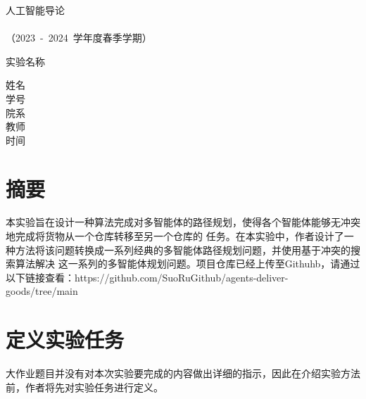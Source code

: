 \documentclass[UTF8]{ctexart}  %
\begin{document}
\begin{titlepage} %
        \heiti
        \vspace*{100pt}
        \begin{center}
            \fontsize{48pt}{0} 人\quad 工\quad 智\quad 能\quad 导\quad 论\\
            \vspace*{36pt}
            \\
            \vspace*{48pt}
            \LARGE（2023\ -\ 2024\ 学年度\quad 春季学期）\\
            \vspace*{48pt}

            \LARGE 实验名称\ \ \underline{}\\
            \vspace*{72pt}

            \heiti\Large 姓名\ \ \underline{}\\
            \heiti\Large 学号\ \ \underline{}\\
            \heiti\Large 院系\ \ \underline{}\\
            \heiti\Large 教师\ \ \underline{}\\
			\heiti\Large 时间\ \ \underline{}\\
        \end{center}
\end{titlepage}

\tableofcontents %
\thispagestyle{empty}

\newpage %
\section{摘要}
本实验旨在设计一种算法完成对多智能体的路径规划，使得各个智能体能够无冲突地完成将货物从一个仓库转移至另一个仓库的
任务。在本实验中，作者设计了一种方法将该问题转换成一系列经典的多智能体路径规划问题，并使用基于冲突的搜索算法解决
这一系列的多智能体规划问题。项目仓库已经上传至Githuhb，请通过以下链接查看：https://github.com/SuoRuGithub/agents-deliver-goods/tree/main

\section{定义实验任务}
大作业题目并没有对本次实验要完成的内容做出详细的指示，因此在介绍实验方法前，作者将先对实验任务进行定义。
\end{document}
